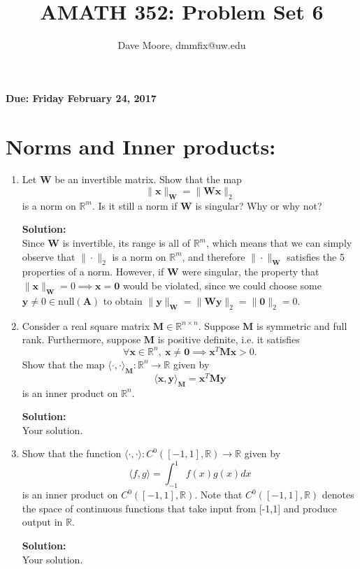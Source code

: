 \documentclass[]{article}
\title{AMATH 352: Problem Set 6}
\author{Dave Moore, dmmfix@uw.edu}
\newcommand{\R}{\mathbb{R}}				%
\newcommand{\x}{\bm{x}}					%
\newcommand{\y}{\bm{y}}					%
\newcommand{\A}{\bm{A}}					%
\newcommand{\vnull}{\mathrm{null}}		%
\newcommand{\la}{\langle}				%
\newcommand{\ra}{\rangle}				%
\newcommand{\solution}{\vskip 0.5cm \textbf{\large Solution:} \\}
\begin{document}
\maketitle
    {\Large \textbf{Due: Friday February 24, 2017}} \\

    \section*{Norms and Inner products:}
    \begin{enumerate}[resume]
	\item Let $\bm{W}$ be an invertible matrix. Show that the map
	  \[
	  \|\x\|_{\bm{W}}=\|\bm{Wx}\|_2
	  \]
	  is a norm on $\R^m$. Is it still a norm if $\bm{W}$ is singular? Why or why not?

	  \solution Since $\bm{W}$ is invertible, its range is all of
      $\R^m$, which means that we can simply observe that
      $\|\cdot\|_2$ is a norm on $\R^m$, and therefore
      $\|\cdot\|_{\bm{W}}$ satisfies the 5 properties of a
      norm. However, if $\bm{W}$ were singular, the property that
      $\|\x\|_{\bm{W}} = 0 \implies \x = \bm{0}$ would be violated,
      since we could choose some $\y \neq 0 \in \vnull(\A)$ to obtain
      $\|\y\|_{\bm{W}} = \|\bm{Wy}\|_2 = \|\bm{0}\|_2 = 0$.


	\item Consider a real square matrix $\bm{M}\in\R^{n\times n}$. Suppose $\bm{M}$ is symmetric and full rank. Furthermore, suppose $\bm{M}$ is positive definite, i.e. it satisfies
	  \[
	  \forall\x\in\R^n,~\x\neq\bm{0}\implies \x^T\bm{Mx}>0.
	  \]
	  Show that the map $\la\cdot,\cdot\ra_{\bm{M}}:\R^n\to\R$ given by
	  \[
	  \la \x,\y\ra_{\bm{M}} =\x^T\bm{My}
	  \]
	  is an inner product on $\R^n$.

	  \solution Your solution.

	\item Show that the function $\la\cdot,\cdot\ra:C^0([-1,1],\R)\to\R$ given by 
	  \[
	  \la f,g\ra = \int^1_{-1}f(x)g(x)dx
	  \]
	  is an inner product on $C^0([-1,1],\R)$. Note that $C^0([-1,1],\R)$ denotes the space of continuous functions that take input from [-1,1] and produce output in $\R$.

	  \solution Your solution.

    \end{enumerate}
\end{document}
